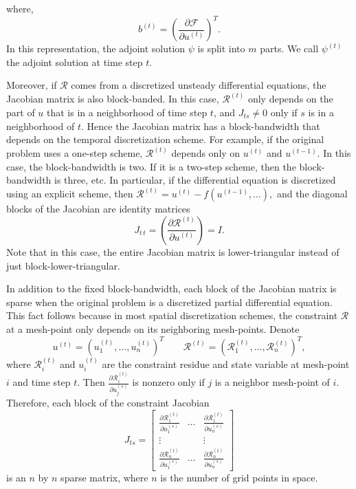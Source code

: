 \documentclass[a4paper,11pt]{article}
\theoremstyle{remark}
\theoremstyle{definition}
\begin{document}
    where,
    \[ b^{(t)} =
        \left( \frac{\partial \mathcal{F}}{\partial u^{(t)}} \right)^T.
    \]
    In this representation, the adjoint solution $\psi$ is split into $m$ parts.
    We call $\psi^{(t)}$ the adjoint solution at time step $t$.
    
    Moreover, if $\mathcal{R}$ comes from a discretized unsteady
    differential equations, the Jacobian matrix is also block-banded.  In
    this case, $\mathcal{R}^{(t)}$ only depends on the part of $u$ that
    is in a neighborhood of time step $t$, and $J_{t s} \ne 0$ only if
    $s$ is in a neighborhood of $t$.  Hence the Jacobian matrix has a
    block-bandwidth that depends on the temporal discretization scheme.
    For example, if the original problem uses a one-step scheme,
    $\mathcal{R}^{(t)}$ depends only on $u^{(t)}$ and $u^{(t-1)}$.  In
    this case, the block-bandwidth is two.  If it is a two-step scheme,
    then the block-bandwidth is three, etc.  In particular, if the
    differential equation is discretized using an explicit scheme, then
    $ \mathcal{R}^{(t)} = u^{(t)} - f(u^{(t-1)},\ldots) ,$
    and the diagonal blocks of the Jacobian are identity matrices
    $$ J_{t\,t} =
        \left( \frac{\partial \mathcal{R}^{(t)}}{\partial u^{(t)}} \right) = I.
    $$
    Note that in this case, the entire Jacobian matrix is
    lower-triangular instead of just block-lower-triangular.
    
    In addition to the fixed block-bandwidth, each block of the Jacobian matrix
    is sparse when the original problem is a discretized partial differential
    equation.   This fact follows because in most spatial discretization
    schemes, the constraint $\mathcal{R}$ at a mesh-point only depends on
    its neighboring mesh-points. Denote
    \[ u^{(t)} = \left( u_1^{(t)}, \ldots, u_n^{(t)} \right)^T  \qquad
        \mathcal{R}^{(t)} = \left( \mathcal{R}_1^{(t)}, \ldots,
        \mathcal{R}_n^{(t)} \right)^T,
    \]
    where $\mathcal{R}_i^{(t)}$ and $u_i^{(t)}$ are the constraint residue and
    state variable at mesh-point $i$ and time step $t$.  Then
    $\frac{\partial \mathcal{R}_i^{(t)}}{\partial u_j^{(s)}}$ is nonzero only
    if $j$ is a neighbor mesh-point of $i$.  Therefore, each block of the
    constraint Jacobian
    \[ J_{t s} =
        \begin{bmatrix}
            \frac{\partial \mathcal{R}_1^{(t)}}{\partial u_1^{(s)}} & \ldots &
                \frac{\partial \mathcal{R}_1^{(t)}}{\partial u_n^{(s)}} \\
            \vdots & & \vdots \\
            \frac{\partial \mathcal{R}_n^{(t)}}{\partial u_1^{(s)}} & \ldots &
                \frac{\partial \mathcal{R}_n^{(t)}}{\partial u_n^{(s)}}
        \end{bmatrix}
    \]
    is an $n$ by $n$ sparse matrix, where $n$ is the number of grid points
    in space.
    
\end{document}
